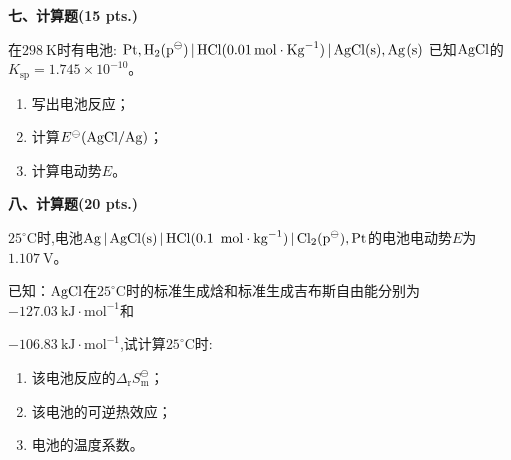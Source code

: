 \vspace{0.5cm}
\noindent\textbf{七、计算题(15 pts.)}

在$298\ \mathrm{K}$时有电池:
$\ce{Pt,H2(p^\ominus) | HCl(0.01mol\cdot Kg^{-1}) | AgCl(s),Ag(s)}$
已知$\ce{AgCl}$的$K_{\mathrm{sp}}=1.745\times10^{-10}$。
\begin{enumerate}[label=(\arabic*), itemsep=1ex]
    \item 写出电池反应；
    \item 计算$E^\ominus(\ce{AgCl/Ag})$；
    \item 计算电动势$E$。
\end{enumerate}

\vspace{0.5cm}
\noindent\textbf{八、计算题(20 pts.)}

$25^\circ\mathrm{C}$时,电池$\ce{Ag | AgCl(s) | HCl(0.1\ mol\cdot kg^{-1}) | Cl2(p^\ominus),Pt}$的电池电动势$E$为$1.107\ \mathrm{V}$。

已知：$\ce{AgCl}$在$25^\circ\mathrm{C}$时的标准生成焓和标准生成吉布斯自由能分别为$-127.03\ \mathrm{kJ\cdot mol^{-1}}$和

$-106.83\ \mathrm{kJ\cdot mol^{-1}}$,试计算$25^\circ\mathrm{C}$时:
\begin{enumerate}[label=(\arabic*), itemsep=1ex]
    \item 该电池反应的$\Delta_\mathrm{r}S_\mathrm{m}^\ominus$；
    \item 该电池的可逆热效应；
    \item 电池的温度系数。
\end{enumerate}